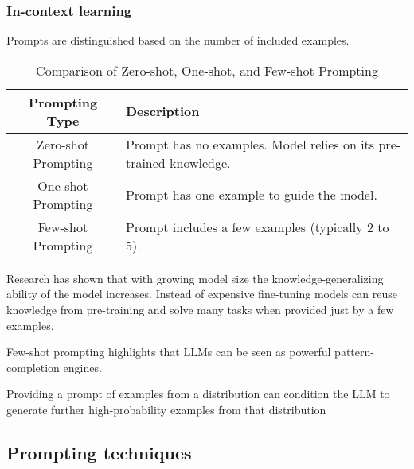\subsubsection{In-context learning}

Prompts are distinguished based on the number of included examples.

\begin{table}[ht!]
    \centering
    \begin{tabular}{|c|p{8cm}|}
    \hline
    \textbf{Prompting Type} & \textbf{Description} \\
    \hline
    Zero-shot Prompting & Prompt has no examples. Model relies on its pre-trained knowledge. \\
    \hline
    One-shot Prompting & Prompt has one example to guide the model. \\
    \hline
    Few-shot Prompting & Prompt includes a few examples (typically 2 to 5). \\
    \hline
    \end{tabular}
    \caption{Comparison of Zero-shot, One-shot, and Few-shot Prompting}
\end{table}        
Research\cite{brown2020languagemodelsfewshotlearners} has shown that with growing model size the 
knowledge-generalizing ability of the model increases. Instead of expensive fine-tuning
models can reuse knowledge from pre-training and solve many tasks when provided just by a few examples.

Few-shot prompting highlights that LLMs can be seen as powerful pattern-completion engines. \cite{meyerson2024languagemodelcrossovervariation}

Providing a prompt of examples from a distribution can condition the LLM to generate further 
high-probability examples from that distribution \cite{meyerson2024languagemodelcrossovervariation}

\subsection{Prompting techniques}
